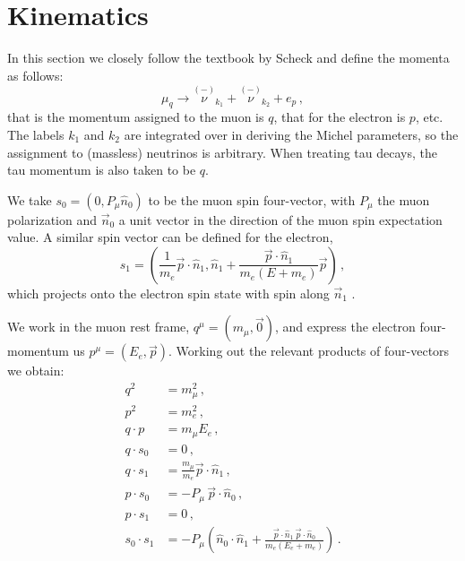 \appendix
\chapter{Kinematics}\label{ch:kinematics}

In this section we closely follow the textbook by Scheck \cite{scheck2012electroweak} and define the momenta as follows:
\begin{equation}
\mu_q\to \overset{\scriptscriptstyle(-)}{\nu}_{k_1}+\overset{\scriptscriptstyle(-)}{\nu}_{k_2}+e_p\, ,
\end{equation}
%
that is the momentum assigned to the muon is $q$, that for the electron is $p$, etc. The labels $k_1$ and $k_2$ are integrated over in deriving the Michel parameters, so the assignment to (massless) neutrinos is arbitrary. When treating tau decays, the tau momentum is also taken to be $q$.

We take $s_0=(0,P_\mu \hat n_0)$ to be the muon spin four-vector, with $P_\mu$ the muon polarization and $\vec n_0$ a unit vector in the direction of the muon spin expectation value. A similar spin vector can be defined for the electron,
%
\begin{equation}
s_1=\left(\frac{1}{m_e}\vec p\cdot \hat n_1, \hat n_1+\frac{\vec p\cdot \hat n_1}{m_e(E+m_e)}\vec p\right)\, ,
\end{equation}
%
which projects onto the electron spin state with spin along $\vec n_1$ \cite{Scheck:1996ur}.

We work in the muon rest frame, $q^\mu=(m_\mu,\vec 0)$, and express the electron four-momentum us $ p^\mu=(E_e,\vec p)$. Working out the relevant products of four-vectors we obtain:
%
\begin{align}
q^2&=m_\mu^2\, ,\\
p^2&=m_e^2\, ,\\
q\cdot p &= m_\mu E_e\, ,\\
q\cdot s_0 &= 0\, ,\\
q\cdot s_1 &= \frac{m_\mu}{m_e}\vec p\cdot \hat n_1\, ,\\
p\cdot s_0 &= -P_\mu\,\vec p\cdot \hat n_0\, ,\\
p\cdot s_1 &= 0\, ,\\
s_0\cdot s_1 &=-P_\mu\left(\hat n_0\cdot\hat n_1+\frac{\vec p\cdot \hat n_1\, \vec p\cdot \hat n_0}{m_e(E_e+m_e)}\right)\, .
\end{align}


